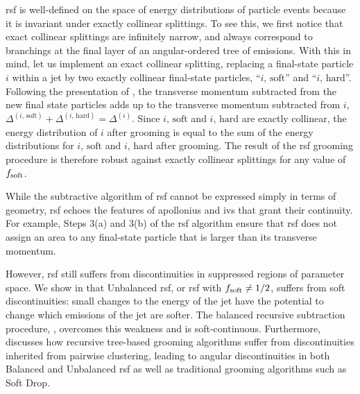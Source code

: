 \gls{rsf} is well-defined on the space of energy distributions of particle events because it is invariant under exactly collinear splittings.
%
To see this, we first notice that exact collinear splittings are infinitely narrow, and always correspond to branchings at the final layer of an angular-ordered tree of emissions.
%
With this in mind, let us implement an exact collinear splitting, replacing a final-state particle \(i\) within a jet by two exactly collinear final-state particles, ``\(i,\,\text{soft}\)'' and ``\(i,\,\text{hard}\)''.
%
Following the presentation of , the transverse momentum subtracted from the new final state particles adds up to the transverse momentum subtracted from \(i\), \(\Delta^{(i,\,\text{soft})} + \Delta^{(i,\,\text{hard})} = \Delta^{(i)}\).
%
Since \(i,\,\text{soft}\) and \(i,\,\text{hard}\) are exactly collinear, the energy distribution of \(i\) after grooming is equal to the sum of the energy distributions for \(i,\,\text{soft}\) and \(i,\,\text{hard}\) after grooming.
%
The result of the \gls{rsf} grooming procedure is therefore robust against exactly collinear splittings for any value of \(f_{\rm soft}\).

While the subtractive algorithm of \gls{rsf} cannot be expressed simply in terms of geometry, \gls{rsf} echoes the features of \gls{apollonius} and \gls{ivs} that grant their continuity.
%
For example, Steps 3(a) and 3(b)
of the \gls{rsf} algorithm ensure that \gls{rsf} does not assign an area to any final-state particle that is larger than its transverse momentum.

However, \gls{rsf} still suffers from discontinuities in suppressed regions of parameter space.
%
We show in  that Unbalanced \gls{rsf}, or \gls{rsf} with \(f_{\rm soft} \neq 1/2\), suffers from soft discontinuities:
%
small changes to the energy of the jet have the potential to change which emissions of the jet are softer.
%
The balanced recursive subtraction procedure, , overcomes this weakness and is soft-continuous.
%
Furthermore,  discusses how recursive tree-based grooming algorithms suffer from discontinuities inherited from pairwise clustering, leading to angular discontinuities in both Balanced and Unbalanced \gls{rsf} as well as traditional grooming algorithms such as Soft Drop.


